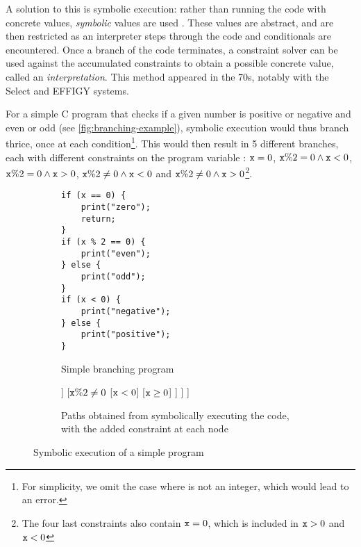 A solution to this is symbolic execution: rather than running the code with concrete values, \emph{symbolic} values are used \cite{surveysymex}. These values are abstract, and are then restricted as an interpreter steps through the code and conditionals are encountered. Once a branch of the code terminates, a constraint solver can be used against the accumulated constraints to obtain a possible concrete value, called an \emph{interpretation}. This method appeared in the 70s, notably with the Select \cite{select-system} and EFFIGY \cite{effigy-system} systems.

For a simple C program that checks if a given number is positive or negative and even or odd (see \autoref{fig:branching-example}), symbolic execution would thus branch thrice, once at each condition\footnote{For simplicity, we omit the case where  is not an integer, which would lead to an error.}. This would then result in 5 different branches, each with different constraints on the program variable : $\code{x} = 0$, $\texttt{x}\%2=0 \land \texttt{x}<0$, $\texttt{x}\%2=0 \land \texttt{x}>0$, $\texttt{x}\%2\neq0 \land \texttt{x}<0$ and $\texttt{x}\%2\neq0 \land \texttt{x}>0$\footnote{The four last constraints also contain $\code{x} = 0$, which is included in $\texttt{x}>0$ and $\code{x}<0$}.

\begin{figure}[h]
\centering
\begin{subfigure}{.5\textwidth}
	\centering
	\begin{lstlisting}
if (x == 0) {
	print("zero");
	return;
}
if (x % 2 == 0) {
	print("even");
} else {
	print("odd");
}
if (x < 0) {
	print("negative");
} else {
	print("positive");
}
	\end{lstlisting}
	\caption{Simple branching program}
\end{subfigure}%
\begin{subfigure}{.5\textwidth}
\centering
\begin{forest}
[{$\top$}
	[{$\code{x} = 0$}]
	[{$\code{x}\neq 0$}
		[{$\code{x}\%2=0$}
			[{$\code{x} < 0$}]
			[{$\code{x} \geq 0$}]
		]
		[{$\texttt{x}\%2\neq0$}
			[{$\code{x} < 0$}]
			[{$\code{x} \geq 0$}]
		]
	]
]
\end{forest}
\caption{Paths obtained from symbolically executing the code, with the added constraint at each node}
\end{subfigure}

\caption{Symbolic execution of a simple program}
	\label{fig:branching-example}
\end{figure}


